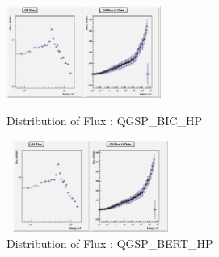 \documentclass[twocolumn,amsmath,amssymb]{snp}
\begin{document}


\begin{figure}
    \centering 
    \begin{minipage}[b]{0.4\textwidth}
        \includegraphics [height=30mm, width=55 mm] {FluxBIC.png}
        \caption{\small Distribution of Flux : QGSP\_BIC\_HP}
    \end{minipage}
    \begin{minipage}[b]{0.4\textwidth}
        \includegraphics [height=30mm, width=55mm] {FluxBERT.png}
        \caption{\small Distribution of Flux : QGSP\_BERT\_HP}
    \end{minipage}
\end{figure}
\end{document}
